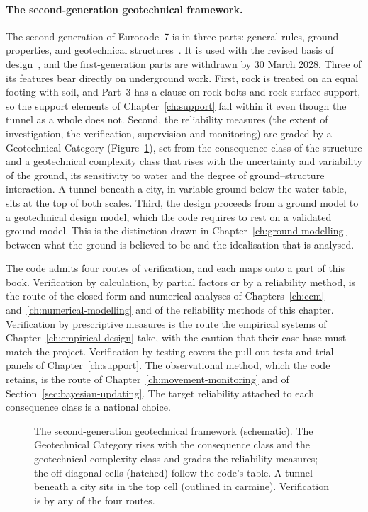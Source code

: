 \paragraph{The second-generation geotechnical framework.}
The second generation of Eurocode~7 is in three parts: general rules,
ground properties, and geotechnical
structures~\citep{en1997part1,en1997part2,en1997part3}. It is used with the
revised basis of design~\citep{en1990part1}, and the first-generation parts are
withdrawn by 30 March 2028. Three of its features bear directly on underground
work. First, rock is treated on an equal footing with soil, and Part~3 has a
clause on rock bolts and rock surface support, so the support elements of
Chapter~\ref{ch:support} fall within it even though the tunnel as a whole does
not. Second, the reliability measures (the extent of investigation, the
verification, supervision and monitoring) are graded by a Geotechnical
Category (Figure~\ref{fig:ec7-category-routes}), set from the consequence class of the structure and a geotechnical
complexity class that rises with the uncertainty and variability of the
ground, its sensitivity to water and the degree of ground--structure
interaction. A tunnel beneath a city, in variable ground below the water table,
sits at the top of both scales. Third, the design proceeds from a ground model
to a geotechnical design model, which the code requires to rest on a validated
ground model. This is the distinction drawn in
Chapter~\ref{ch:ground-modelling} between what the ground is believed to be and
the idealisation that is analysed.

The code admits four routes of verification, and each maps onto a part of this
book. Verification by calculation, by partial factors or by a reliability
method, is the route of the closed-form and numerical analyses of
Chapters~\ref{ch:ccm} and~\ref{ch:numerical-modelling} and of the reliability
methods of this chapter. Verification by prescriptive measures is the route
the empirical systems of Chapter~\ref{ch:empirical-design} take, with the
caution that their case base must match the project. Verification by testing
covers the pull-out tests and trial panels of Chapter~\ref{ch:support}. The
observational method, which the code retains, is the route of
Chapter~\ref{ch:movement-monitoring} and of Section~\ref{sec:bayesian-updating}.
The target reliability attached to each consequence class is a national
choice.

\begin{figure}[htbp]
\centering
{}
\caption{The second-generation geotechnical framework (schematic). The Geotechnical Category rises with the consequence class and the geotechnical complexity class and grades the reliability measures; the off-diagonal cells (hatched) follow the code's table. A tunnel beneath a city sits in the top cell (outlined in carmine). Verification is by any of the four routes.}
\label{fig:ec7-category-routes}
\end{figure}

